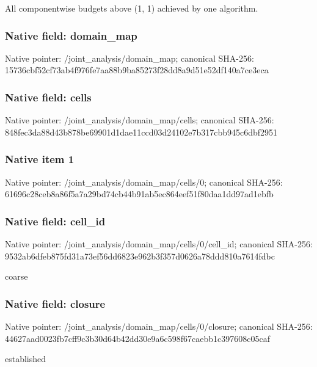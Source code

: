 \documentclass[10pt,a4paper]{article}
\begin{document}
\begingroup\raggedright\sloppy All componentwise budgets above (1,\allowbreak{} 1) achieved by one algorithm.\par\endgroup

\subsubsection{Native field: domain\_\allowbreak{}map}
Native pointer: /joint\_\allowbreak{}analysis/domain\_\allowbreak{}map; canonical SHA-256: 15736cbf52cf73ab4f976fe7aa88b9ba85273f28dd8a9d51e52df140a7ce3eca

\subsubsection{Native field: cells}
Native pointer: /joint\_\allowbreak{}analysis/domain\_\allowbreak{}map/cells; canonical SHA-256: 848fec3da88d43b878be69901d1dae11ccd03d24102e7b317cbb945c6dbf2951

\subsubsection{Native item 1}
Native pointer: /joint\_\allowbreak{}analysis/domain\_\allowbreak{}map/cells/0; canonical SHA-256: 61696c28ceb8a86f5a7a29bd74cb44b91ab5ec864eef51f80daa1dd97ad1ebfb

\subsubsection{Native field: cell\_\allowbreak{}id}
Native pointer: /joint\_\allowbreak{}analysis/domain\_\allowbreak{}map/cells/0/cell\_\allowbreak{}id; canonical SHA-256: 9532ab6dfeb875fd31a73ef56dd6823e962b3f357d0626a78ddd810a7614fdbc

\begingroup\raggedright\sloppy coarse\par\endgroup

\subsubsection{Native field: closure}
Native pointer: /joint\_\allowbreak{}analysis/domain\_\allowbreak{}map/cells/0/closure; canonical SHA-256: 44627aad0023fb7cff9c3b30d64b42dd30e9a6c598f67caebb1c397608c05caf

\begingroup\raggedright\sloppy established\par\endgroup
\end{document}
